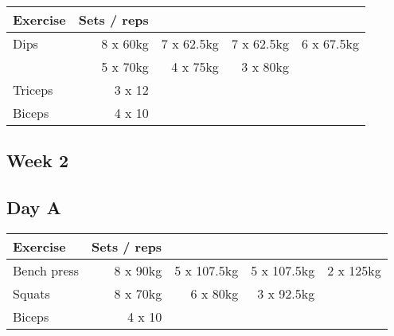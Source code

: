 \documentclass[12pt, a4paper]{article}%
\begin{document}
  \begin{tabular}{l|rrrr}
  \hspace{0.75em} \textbf{Exercise} & \textbf{Sets / reps} \\ \hline

            \hspace{0.75em} Dips
            & 8 x 60kg
            & 7 x 62.5kg
            & 7 x 62.5kg
            & 6 x 67.5kg
            \\


            \hspace{0.75em}
            & 5 x 70kg
            & 4 x 75kg
            & 3 x 80kg
            & 
            \\


   \hspace{0.75em} Triceps & 3 x 12 \\
   \hspace{0.75em} Biceps & 4 x 10 \\
  \end{tabular}

 \subsection*{\hspace{0.25em} Week 2 }
  \subsection*{\hspace{0.5em} Day A }


  \begin{tabular}{l|rrrr}
  \hspace{0.75em} \textbf{Exercise} & \textbf{Sets / reps} \\ \hline

            \hspace{0.75em} Bench press
            & 8 x 90kg
            & 5 x 107.5kg
            & 5 x 107.5kg
            & 2 x 125kg
            \\


            \hspace{0.75em} Squats
            & 8 x 70kg
            & 6 x 80kg
            & 3 x 92.5kg
            & 
            \\


   \hspace{0.75em} Biceps & 4 x 10 \\
  \end{tabular}
\end{document}
